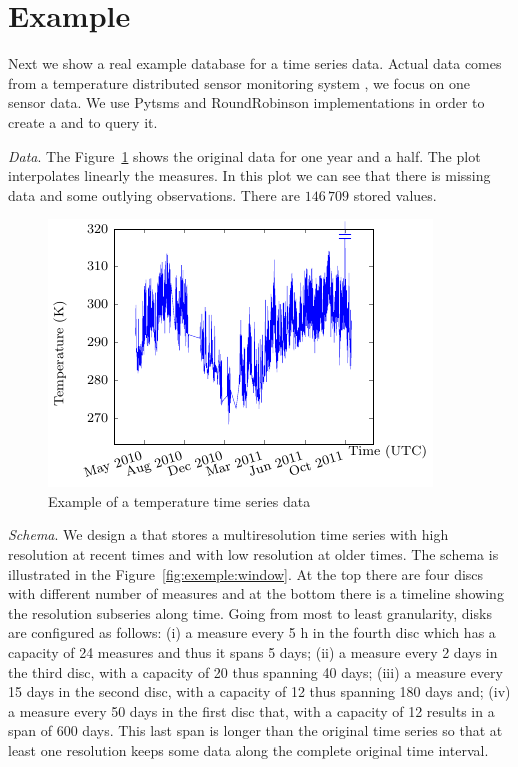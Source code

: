 


\section{Example}
\label{sec:example}


Next we show a real example database for a time series data. Actual
data comes from a temperature distributed sensor monitoring system
\cite{alippi10}, we focus on one sensor data. We use Pytsms and
RoundRobinson implementations in order to create a  and
to query it.

\emph{Data}. The Figure~\ref{fig:exemple:original} shows the original
data for one year and a half. The plot interpolates linearly the
measures. In this plot we can see that there is missing data and some
outlying observations. There are $146\,709$ stored values.

\begin{figure}[tp]
  \centering
  \includegraphics{fig_exemple_original.pdf}
  \caption{Example of a temperature time series data}
  \label{fig:exemple:original}
\end{figure}

\emph{Schema}. We design a  that stores a multiresolution
time series with high resolution at recent times and with low
resolution at older times. The schema is illustrated in the
Figure~\ref{fig:exemple:window}. At the top there are four discs with
different number of measures and at the bottom there is a timeline
showing the resolution subseries along time. Going from most to least
granularity, disks are configured as follows: (i) a measure every 5 h
in the fourth disc which has a capacity of 24 measures and thus it
spans 5 days; (ii) a measure every 2 days in the third disc, with a
capacity of 20 thus spanning 40 days; (iii) a measure every 15 days in
the second disc, with a capacity of 12 thus spanning 180 days and;
(iv) a measure every 50 days in the first disc that, with a capacity
of 12 results in a span of 600 days. This last span is longer than the
original time series so that at least one resolution keeps some data
along the complete original time interval. 

